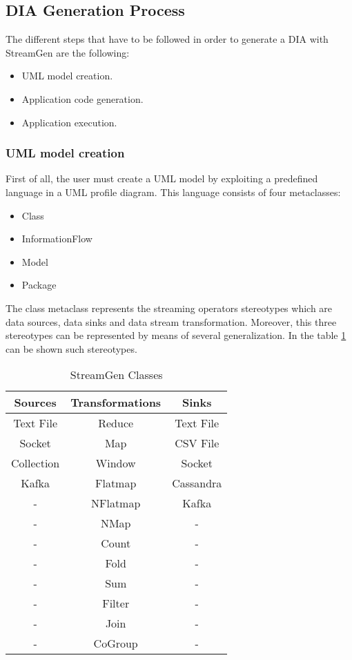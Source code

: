 \subsection{DIA Generation Process}

The different steps that have to be followed in order to generate a DIA with StreamGen are the following:

\begin{itemize}
\item UML model creation.
\item Application code generation.
\item Application execution.
\end{itemize}

\subsubsection*{UML model creation}

First of all, the user must create a UML model by exploiting a predefined language in a UML profile diagram. This language consists of four metaclasses:

\begin{itemize}
\item Class
\item InformationFlow
\item Model
\item Package
\end{itemize}

The class metaclass represents the streaming operators stereotypes which are data sources, data sinks and data stream transformation. Moreover, this three stereotypes can be represented by means of several generalization. In the table \ref{StreamGen Classes} can be shown such stereotypes.

\begin{table}[h!]
\centering
	\begin{tabular}{||c|c|c||} 
	\hline\hline
	Sources & Transformations & Sinks \\ 
	\hline\hline
	Text File & Reduce & Text File \\ 
	\hline
	Socket & Map & CSV File \\ 
	\hline
	Collection & Window & Socket \\ 
	\hline
	Kafka & Flatmap & Cassandra \\ 
	\hline
	 - & NFlatmap & Kafka \\
	\hline
	 - & NMap & - \\
	\hline
	 - & Count & - \\
	\hline
	 - & Fold & - \\
	\hline
	 - & Sum & - \\
	\hline
	 - & Filter & - \\
	\hline
	 - & Join & - \\
	\hline
	 - & CoGroup & - \\
	\hline\hline
	\end{tabular}
\caption{StreamGen Classes}
\label{StreamGen Classes}
\end{table}

